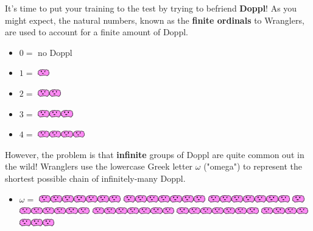 

\newcommand{\mappDoppl}{\includegraphics[height=0.12in]{assets/doppl.pdf}}
\newcommand{\mappDopplOmega}{\includegraphics[height=0.12in]{assets/doppl-omega.pdf}}
\newcommand{\mappDopplOmegaSquared}{\includegraphics[height=0.12in]{assets/doppl-omega2.pdf}}

It's time to put your training to the test by trying to befriend \textbf{Doppl}!
As you might expect, the natural
numbers, known as the \textbf{finite ordinals} to \mappMobimon{} Wranglers,
are used to account for a finite amount of Doppl.

\begin{itemize}
\item \(0=\) no Doppl

\item \(1=\) \mappDoppl

\item \(2=\) \mappDoppl\mappDoppl

\item \(3=\) \mappDoppl\mappDoppl\mappDoppl

\item \(4=\) \mappDoppl\mappDoppl\mappDoppl\mappDoppl
\end{itemize}

However, the problem is that \textbf{infinite} groups of Doppl are quite
common out in the wild! Wranglers use the lowercase Greek letter \(\omega\)
("omega") to represent the shortest possible chain of infinitely-many Doppl.

\begin{itemize}
  \item \(\omega=\)
  \mappDoppl\mappDoppl\mappDoppl\mappDoppl\mappDoppl\mappDoppl\mappDoppl
  \mappDoppl\mappDoppl\mappDoppl\mappDoppl\mappDoppl\mappDoppl\mappDoppl
  \mappDoppl\mappDoppl\mappDoppl\mappDoppl\mappDoppl\mappDoppl\mappDoppl
  \mappDoppl\mappDoppl\mappDoppl\mappDoppl\mappDoppl\mappDoppl\mappDoppl
  \mappDoppl\mappDoppl\mappDoppl\mappDoppl\mappDoppl\mappDoppl\mappDoppl
  \mappDoppl\mappDoppl\mappDoppl\mappDoppl\mappDoppl\mappDoppl\mappDoppl
  \mappDoppl\mappDoppl\mappDoppl\mappDoppl\mappDoppl\mappDoppl\mappDoppl
\end{itemize}

